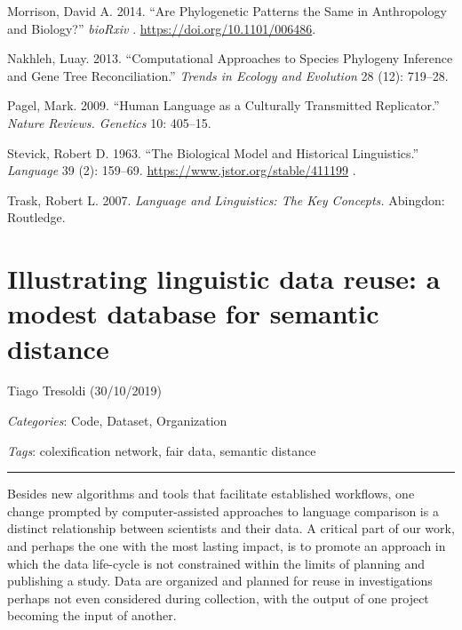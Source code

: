 \documentclass[
  a4paper,
  14pt,
  oneside,
  tablecaptionabove
]{scrbook}
\begin{document}
\nopagebreak\hangindent=0.7cm {\small Morrison, David A. 2014. \enquote{Are Phylogenetic Patterns the Same
in Anthropology and Biology?} \emph{bioRxiv} .
\url{https://doi.org/10.1101/006486}. }

\nopagebreak\hangindent=0.7cm {\small Nakhleh, Luay. 2013. \enquote{Computational Approaches to Species
Phylogeny Inference and Gene Tree Reconciliation.} \emph{Trends in
Ecology and Evolution} 28 (12): 719--28. }

\nopagebreak\hangindent=0.7cm {\small Pagel, Mark. 2009. \enquote{Human Language as a Culturally
Transmitted Replicator.} \emph{Nature Reviews. Genetics} 10: 405--15. }

\nopagebreak\hangindent=0.7cm {\small Stevick, Robert D. 1963. \enquote{The Biological Model and
Historical Linguistics.} \emph{Language} 39 (2): 159--69.
\url{https://www.jstor.org/stable/411199} . }

\nopagebreak\hangindent=0.7cm {\small Trask, Robert L. 2007. \emph{Language and Linguistics: The Key
Concepts.} Abingdon: Routledge. }

\newpage
\section*{Illustrating linguistic data reuse: a modest
database for semantic distance}

Tiago Tresoldi (30/10/2019)

\emph{Categories}: Code, Dataset, Organization

\emph{Tags}: colexification network, fair data, semantic distance

\begin{center}\rule{0.5\linewidth}{1pt}\end{center}

Besides new algorithms and tools that facilitate established workflows,
one change prompted by computer-assisted approaches to language
comparison is a distinct relationship between scientists and their data.
A critical part of our work, and perhaps the one with the most lasting
impact, is to promote an approach in which the data life-cycle is not
constrained within the limits of planning and publishing a study. Data
are organized and planned for reuse in investigations perhaps not even
considered during collection, with the output of one project becoming
the input of another.
\end{document}
